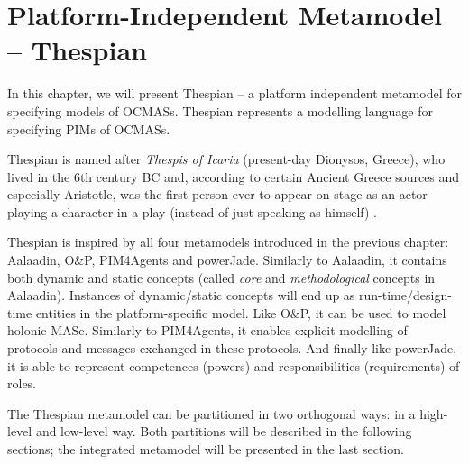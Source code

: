 
\chapter{Platform-Independent Metamodel -- Thespian}

In this chapter, we will present Thespian -- a platform independent metamodel for specifying models of OCMASs.
Thespian represents a modelling language for specifying PIMs of OCMASs.

Thespian is named after \textit{Thespis of Icaria} (present-day Dionysos, Greece), who lived in the 6th century BC and, according to certain Ancient Greece sources and especially Aristotle, was the first person ever to appear on stage as an actor playing a character in a play (instead of just speaking as himself) \cite{Wikipedia-Thespis}.

Thespian is inspired by all four metamodels introduced in the previous chapter: Aalaadin, O\&P, PIM4Agents and powerJade.
Similarly to Aalaadin, it contains both dynamic and static concepts (called \textit{core} and \textit{methodological} concepts in Aalaadin). Instances of dynamic/static concepts will end up as run-time/design-time entities in the platform-specific model.
Like O\&P, it can be used to model holonic MASe.
Similarly to PIM4Agents, it enables explicit modelling of protocols and messages exchanged in these protocols. 
And finally like powerJade, it is able to represent competences (powers) and responsibilities (requirements) of roles.

The Thespian metamodel can be partitioned in two orthogonal ways: in a high-level and low-level way.
Both partitions will be described in the following sections; the integrated metamodel will be presented in the last section.

